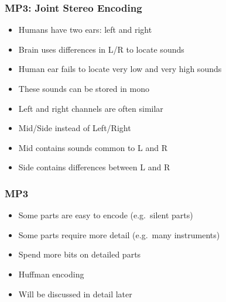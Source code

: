 \documentclass{../ucll-slides}
\begin{document}
\begin{frame}
  \frametitle{MP3: Joint Stereo Encoding}
  \begin{itemize}
    \item Humans have two ears: left and right
    \item Brain uses differences in L/R to locate sounds
    \item Human ear fails to locate very low and very high sounds
    \item These sounds can be stored in mono
  \end{itemize}
  \vskip5mm
  \begin{itemize}
    \item Left and right channels are often similar
    \item Mid/Side instead of Left/Right
    \item Mid contains sounds common to L and R
    \item Side contains differences between L and R
  \end{itemize}
\end{frame}

\begin{frame}
  \frametitle{MP3}
  \begin{itemize}
    \item Some parts are easy to encode (e.g.\ silent parts)
    \item Some parts require more detail (e.g.\ many instruments)
    \item Spend more bits on detailed parts
  \end{itemize}
  \vskip5mm
  \begin{itemize}
    \item Huffman encoding
    \item Will be discussed in detail later
  \end{itemize}
\end{frame}
\end{document}
